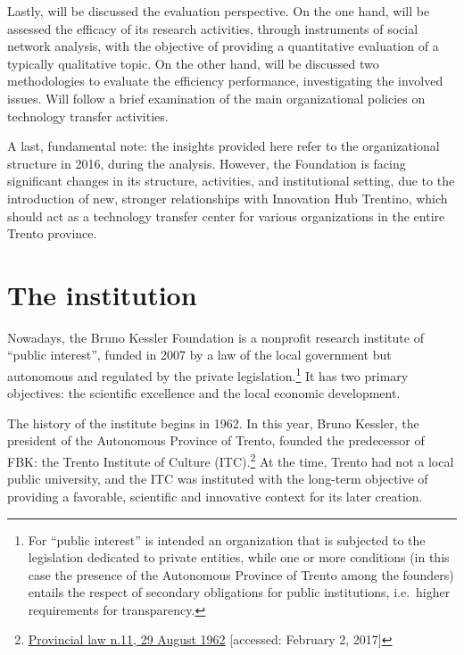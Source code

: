 Lastly, will be discussed the evaluation perspective. On the one hand, will be assessed the efficacy of its research activities, through instruments of social network analysis, with the objective of providing a quantitative evaluation of a typically qualitative topic. On the other hand, will be discussed two methodologies to evaluate the efficiency performance, investigating the involved issues. Will follow a brief examination of the main organizational policies on technology transfer activities.

A last, fundamental note: the insights provided here refer to the organizational structure in 2016, during the analysis. However, the Foundation is facing significant changes in its structure, activities, and institutional setting, due to the introduction of new, stronger relationships with Innovation Hub Trentino, which should act as a technology transfer center for various organizations in the entire Trento province. 

\section{The institution}

Nowadays, the Bruno Kessler Foundation is a nonprofit research institute of \enquote{public interest}, funded in 2007 by a law of the local government but autonomous and regulated by the private legislation.\footnote{For \enquote{public interest} is intended an organization that is subjected to the legislation dedicated to private entities, while one or more conditions (in this case the presence of the Autonomous Province of Trento among the founders) entails the respect of secondary obligations for public institutions, i.e.\ higher requirements for transparency.} It has two primary objectives: the scientific excellence and the local economic development.

The history of the institute begins in 1962. In this year, Bruno Kessler, the president of the Autonomous Province of Trento, founded the predecessor of FBK: the Trento Institute of Culture (ITC).\footnote{
	\href{http://www.consiglio.provincia.tn.it/leggi-e-archivi/codice-provinciale/archivio/Pages/Legge\%20provinciale\%2029\%20agosto\%201962,\%20n.\%2011_565.aspx}
	{Provincial law n.11, 29 August 1962}
	[accessed: February 2, 2017]
} At the time, Trento had not a local public university, and the ITC was instituted with the long-term objective of providing a favorable, scientific and innovative context for its later creation. 

